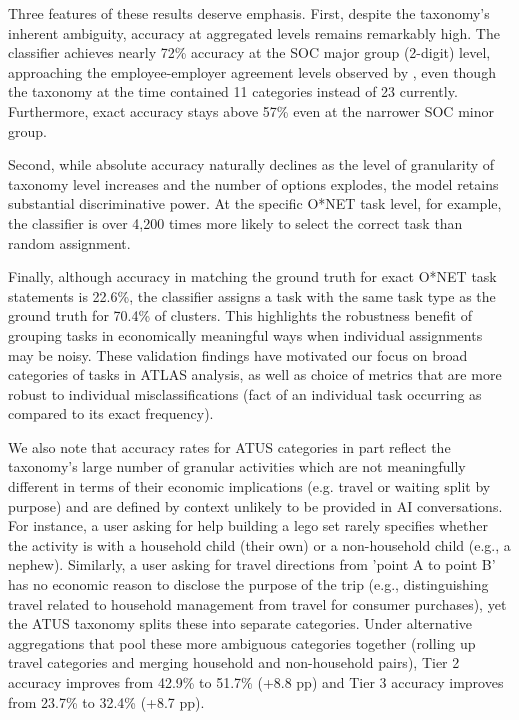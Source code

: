 \documentclass[11pt,a4paper]{article}
\begin{document}
Three features of these results deserve emphasis. First, despite the taxonomy's inherent ambiguity, accuracy at aggregated levels remains remarkably high. The classifier achieves nearly 72\% accuracy at the SOC major group (2-digit) level, approaching the employee-employer agreement levels observed by \cite{10.1086/269327}, even though the taxonomy at the time contained 11 categories instead of 23 currently. Furthermore, exact accuracy stays above 57\% even at the narrower SOC minor group.

Second, while absolute accuracy naturally declines as the level of granularity of taxonomy level increases and the number of options explodes, the model retains substantial discriminative power. At the specific O*NET task level, for example, the classifier is over 4,200 times more likely to select the correct task than random assignment.

Finally, although accuracy in matching the ground truth for exact O*NET task statements is 22.6\%, the classifier assigns a task with the same \cite{NBERw33941} task type as the ground truth for 70.4\% of clusters. This highlights the robustness benefit of grouping tasks in economically meaningful ways when individual assignments may be noisy. These validation findings have motivated our focus on broad categories of tasks in ATLAS analysis, as well as choice of metrics that are more robust to individual misclassifications (fact of an individual task occurring as compared to its exact frequency).

We also note that accuracy rates for ATUS categories in part reflect the taxonomy’s large number of granular activities which are not meaningfully different in terms of their economic implications (e.g. travel or waiting split by purpose) and are defined by context unlikely to be provided in AI conversations. For instance, a user asking for help building a lego set rarely specifies whether the activity is with a household child (their own) or a non-household child (e.g., a nephew). Similarly, a user asking for travel directions from 'point A to point B' has no economic reason to disclose the purpose of the trip (e.g., distinguishing travel related to household management from travel for consumer purchases), yet the ATUS taxonomy splits these into separate categories. Under alternative aggregations that pool these more ambiguous categories together (rolling up travel categories and merging household and non-household pairs), Tier 2 accuracy improves from 42.9\% to 51.7\% (+8.8 pp) and Tier 3 accuracy improves from 23.7\% to 32.4\% (+8.7 pp).
\end{document}
